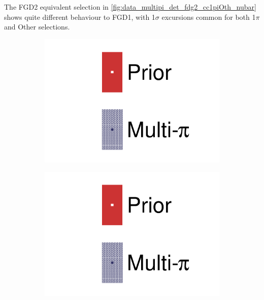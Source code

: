 The FGD2 equivalent selection in \autoref{fig:data_multipi_det_fdg2_cc1piOth_nubar} shows quite different behaviour to FGD1, with 1$\sigma$ excursions common for both 1$\pi$ and Other selections.
\begin{figure}[h]
	\centering
	\begin{subfigure}[t]{0.1\textwidth}
		\includegraphics[width=\textwidth,page=1, trim={0mm 120mm 40mm 20mm}, clip]{figures/mach3/2018/data/2018a_FixedCov_RedCov_Mpi_Data_merge_drawPar_withDet}
	\end{subfigure}
	\begin{subfigure}[t]{0.1\textwidth}
		\includegraphics[width=\textwidth,page=1, trim={0mm 20mm 40mm 120mm}, clip]{figures/mach3/2018/data/2018a_FixedCov_RedCov_Mpi_Data_merge_drawPar_withDet}
	\end{subfigure}


\end{figure}
